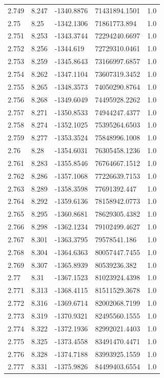 \begin{tabular}{lllll}
2.749 & 8.247 & -1340.8876 & 71431894.1501 & 1.0 \\
2.75 & 8.25 & -1342.1306 & 71861773.894 & 1.0 \\
2.751 & 8.253 & -1343.3744 & 72294240.6697 & 1.0 \\
2.752 & 8.256 & -1344.619 & 72729310.0461 & 1.0 \\
2.753 & 8.259 & -1345.8643 & 73166997.6857 & 1.0 \\
2.754 & 8.262 & -1347.1104 & 73607319.3452 & 1.0 \\
2.755 & 8.265 & -1348.3573 & 74050290.8764 & 1.0 \\
2.756 & 8.268 & -1349.6049 & 74495928.2262 & 1.0 \\
2.757 & 8.271 & -1350.8533 & 74944247.4377 & 1.0 \\
2.758 & 8.274 & -1352.1025 & 75395264.6503 & 1.0 \\
2.759 & 8.277 & -1353.3524 & 75848996.1008 & 1.0 \\
2.76 & 8.28 & -1354.6031 & 76305458.1236 & 1.0 \\
2.761 & 8.283 & -1355.8546 & 76764667.1512 & 1.0 \\
2.762 & 8.286 & -1357.1068 & 77226639.7153 & 1.0 \\
2.763 & 8.289 & -1358.3598 & 77691392.447 & 1.0 \\
2.764 & 8.292 & -1359.6136 & 78158942.0773 & 1.0 \\
2.765 & 8.295 & -1360.8681 & 78629305.4382 & 1.0 \\
2.766 & 8.298 & -1362.1234 & 79102499.4627 & 1.0 \\
2.767 & 8.301 & -1363.3795 & 79578541.186 & 1.0 \\
2.768 & 8.304 & -1364.6363 & 80057447.7455 & 1.0 \\
2.769 & 8.307 & -1365.8939 & 80539236.382 & 1.0 \\
2.77 & 8.31 & -1367.1523 & 81023924.4398 & 1.0 \\
2.771 & 8.313 & -1368.4115 & 81511529.3678 & 1.0 \\
2.772 & 8.316 & -1369.6714 & 82002068.7199 & 1.0 \\
2.773 & 8.319 & -1370.9321 & 82495560.1555 & 1.0 \\
2.774 & 8.322 & -1372.1936 & 82992021.4403 & 1.0 \\
2.775 & 8.325 & -1373.4558 & 83491470.4471 & 1.0 \\
2.776 & 8.328 & -1374.7188 & 83993925.1559 & 1.0 \\
2.777 & 8.331 & -1375.9826 & 84499403.6554 & 1.0 \\

\end{tabular}
